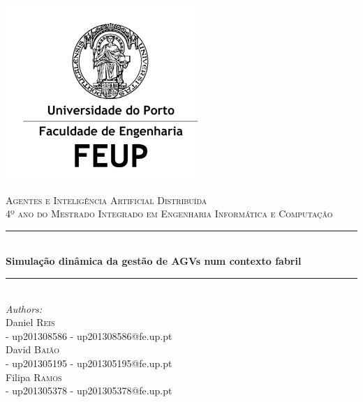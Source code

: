 \begin{titlepage}

\newcommand{\HRule}{\rule{\linewidth}{1mm}} %

\center %
 

\includegraphics{feup.jpg}

\textsc{\large Agentes e Inteligência Artificial Distribuída}\\[0.8cm] %
\textsc{\large 4º ano do Mestrado Integrado em Engenharia Informática e Computação}\\[0.8cm] %


\HRule \\[1.2cm]
{ \huge \bfseries Simulação dinâmica da gestão de AGVs num contexto fabril}\\[0.6cm] %
\HRule \\[2.5cm]
 


\Large \emph{Authors:}\\[0.5cm] \normalsize
Daniel \textsc{Reis}\\[0.1cm] - up201308586 
- up201308586@fe.up.pt\\[0.1cm]
David \textsc{Baião}\\[0.1cm] - up201305195
- up201305195@fe.up.pt\\[0.1cm] 
Filipa \textsc{Ramos}\\[0.1cm] - up201305378
- up201305378@fe.up.pt\\[3cm] %


\end{titlepage}
